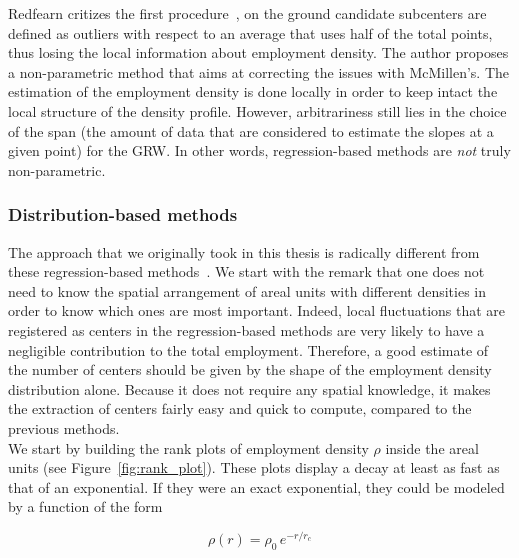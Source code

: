 Redfearn critizes the first procedure~\cite{Redfearn:2007}, on the ground candidate
subcenters are defined as outliers with respect to an average that uses half of the total
points, thus losing the local information about employment
density. The author proposes a non-parametric method that aims at correcting the issues
with McMillen's\cite{Redfearn:2007}. The estimation of the employment density is
done locally in order to keep intact the local structure of the density profile.
However, arbitrariness still lies in the choice of the span (the amount of data
that are considered to estimate the slopes at a given point) for the GRW. In
other words, regression-based methods are \emph{not} truly non-parametric.\\

\subsubsection{Distribution-based methods}
\label{ssub:distribution_based_methods}


The approach that we originally took in this thesis is radically different from
these regression-based methods~\cite{Louf:2013_polycentric}. We start with the
remark that one does not need to know the spatial arrangement of areal units
with different densities in order to know which ones are most important. Indeed,
local fluctuations that are registered as centers in the regression-based
methods are very likely to have a negligible contribution to the total
employment. Therefore, a good estimate of the number of centers should be given
by the shape of the employment density distribution alone. Because it does not
require any spatial knowledge, it makes the extraction of centers fairly easy
and quick to compute, compared to the previous methods.\\


We start by building the rank plots of employment density $\rho$ inside the
areal units (see Figure~\ref{fig:rank_plot}). These plots display a decay at least as fast as that of an
exponential. If they were an exact exponential, they could be modeled by a
function of the form

\begin{equation}
    \rho(r) = \rho_0\,e^{-r/r_c}
    \label{eq:}
\end{equation}

